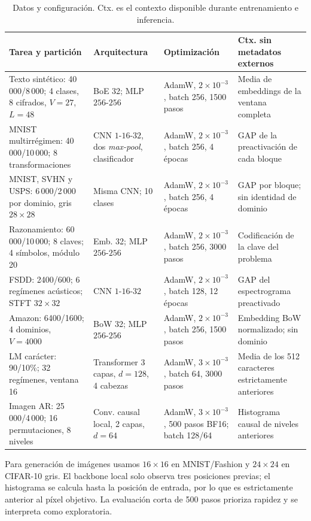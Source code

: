 \documentclass[runningheads]{llncs}
\begin{document}
\begin{table}[t]
\centering
\caption{Datos y configuración. Ctx. es el contexto disponible durante entrenamiento e inferencia.}
\label{tab:protocol}
\scriptsize
\begin{tabular}{@{}p{2.45cm}p{3.05cm}p{2.65cm}p{3.05cm}@{}}
\toprule
Tarea y partición & Arquitectura & Optimización & Ctx. sin metadatos externos\\
\midrule
Texto sintético: 40\,000/8\,000; 4 clases, 8 cifrados, $V=27$, $L=48$ &
BoE 32; MLP $256$-$256$ &
AdamW, $2{\times}10^{-3}$, batch 256, 1500 pasos &
Media de embeddings de la ventana completa\\
MNIST multirrégimen: 40\,000/10\,000; 8 transformaciones &
CNN $1$-$16$-$32$, dos \textit{max-pool}, clasificador &
AdamW, $2{\times}10^{-3}$, batch 256, 4 épocas &
GAP de la preactivación de cada bloque\\
MNIST, SVHN y USPS: 6\,000/2\,000 por dominio, gris $28{\times}28$ &
Misma CNN; 10 clases &
AdamW, $2{\times}10^{-3}$, batch 256, 4 épocas &
GAP por bloque; sin identidad de dominio\\
Razonamiento: 60\,000/10\,000; 8 claves; 4 símbolos, módulo 20 &
Emb. 32; MLP $256$-$256$ &
AdamW, $2{\times}10^{-3}$, batch 256, 3000 pasos &
Codificación de la clave del problema\\
FSDD: 2400/600; 6 regímenes acústicos; STFT $32{\times}32$ &
CNN $1$-$16$-$32$ &
AdamW, $2{\times}10^{-3}$, batch 128, 12 épocas &
GAP del espectrograma preactivado\\
Amazon: 6400/1600; 4 dominios, $V=4000$ &
BoW 32; MLP $256$-$256$ &
AdamW, $2{\times}10^{-3}$, batch 256, 1500 pasos &
Embedding BoW normalizado; sin dominio\\
LM carácter: 90/10\%; 32 regímenes, ventana 16 &
Transformer 3 capas, $d=128$, 4 cabezas &
AdamW, $3{\times}10^{-3}$, batch 64, 3000 pasos &
Media de los 512 caracteres estrictamente anteriores\\
Imagen AR: 25\,000/4\,000; 16 permutaciones, 8 niveles &
Conv. causal local, 2 capas, $d=64$ &
AdamW, $3{\times}10^{-3}$, 500 pasos BF16; batch 128/64 &
Histograma causal de niveles anteriores\\
\bottomrule
\end{tabular}
\end{table}

Para generación de imágenes usamos $16{\times}16$ en MNIST/Fashion y $24{\times}24$ en CIFAR-10 gris. El backbone local solo observa tres posiciones previas; el histograma se calcula hasta la posición de entrada, por lo que es estrictamente anterior al píxel objetivo. La evaluación corta de 500 pasos prioriza rapidez y se interpreta como exploratoria.
\end{document}
